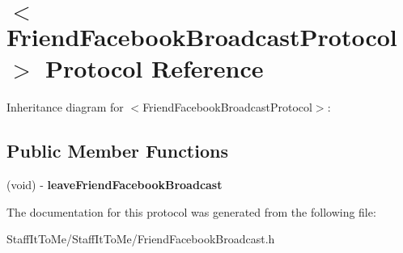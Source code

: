 \hypertarget{protocol_friend_facebook_broadcast_protocol-p}{
\section{$<$\-Friend\-Facebook\-Broadcast\-Protocol$>$ \-Protocol \-Reference}
\label{protocol_friend_facebook_broadcast_protocol-p}
}


\-Inheritance diagram for $<$\-Friend\-Facebook\-Broadcast\-Protocol$>$\-:
\subsection*{\-Public \-Member \-Functions}
\begin{DoxyCompactItemize}
\item 
\hypertarget{protocol_friend_facebook_broadcast_protocol-p_a4454853cc4c1c33953f408ac42afff1a}{
(void) -\/ {\bfseries leave\-Friend\-Facebook\-Broadcast}}
\label{protocol_friend_facebook_broadcast_protocol-p_a4454853cc4c1c33953f408ac42afff1a}

\end{DoxyCompactItemize}


\-The documentation for this protocol was generated from the following file\-:\begin{DoxyCompactItemize}
\item 
\-Staff\-It\-To\-Me/\-Staff\-It\-To\-Me/\-Friend\-Facebook\-Broadcast.\-h\end{DoxyCompactItemize}

